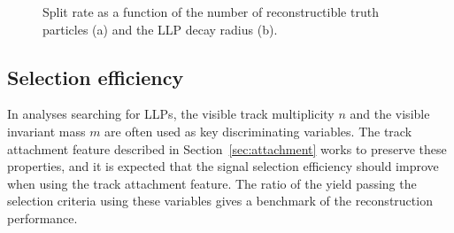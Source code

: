 \documentclass[PUB,UKenglish, texlive=2018]{\ATLASLATEXPATH atlasdoc}
\begin{document}
\begin{figure}[h]
\begin{center}
\caption{Split rate as a function of the number of reconstructible truth particles (a) and the LLP decay radius (b). }
\label{fig:splitRate}
\end{center}
\end{figure}

\subsection{Selection efficiency \label{sec:vertProp}}

In analyses searching for LLPs, the visible track multiplicity $n$ and the visible invariant mass $m$ are often used as key discriminating variables. 
The track attachment feature described in Section~\ref{sec:attachment} works to preserve these properties, and it is expected that the signal selection efficiency should improve when using the track attachment feature.
The ratio of the yield passing the selection criteria using these variables gives a benchmark of the reconstruction performance. 
\end{document}
